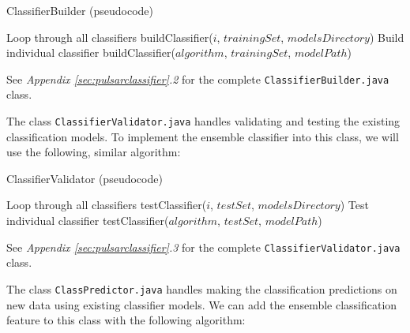 \documentclass{article}
\begin{document}
\begin{algorithm}[H]
    \caption{ClassifierBuilder (pseudocode)}
    \begin{algorithmic}[1]
                \Comment Loop through all classifiers
                \State buildClassifier($i$, $trainingSet$, $modelsDirectory$)
            \EndFor
        \Else 
            \Comment Build individual classifier
            \State buildClassifier($algorithm$, $trainingSet$, $modelPath$)
            
        \EndIf
        
    \end{algorithmic}
\end{algorithm}

See \emph{Appendix \ref{sec:pulsarclassifier}.2} for the complete \verb|ClassifierBuilder.java| class. 

The class \verb|ClassifierValidator.java| handles validating and testing the existing classification models. To implement the ensemble classifier into this class, we will use the following, similar algorithm:

\begin{algorithm}[H]
    \caption{ClassifierValidator (pseudocode)}
    \begin{algorithmic}[1]
                \Comment Loop through all classifiers
                \State testClassifier($i$, $testSet$, $modelsDirectory$)
            \EndFor
        \Else 
            \Comment Test individual classifier
            \State testClassifier($algorithm$, $testSet$, $modelPath$)
        \EndIf
        
    \end{algorithmic}
\end{algorithm}

See \emph{Appendix \ref{sec:pulsarclassifier}.3} for the complete \verb|ClassifierValidator.java| class. 

The class \verb|ClassPredictor.java| handles making the classification predictions on new data using existing classifier models. We can add the ensemble classification feature to this class with the following algorithm:
\end{document}
